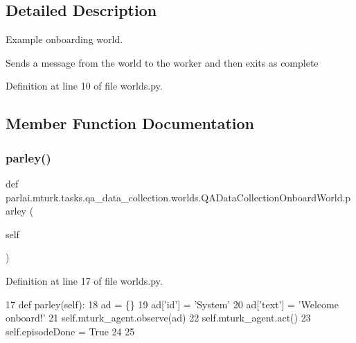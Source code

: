 \subsection{Detailed Description}
\begin{DoxyVerb}Example onboarding world.

Sends a message from the world to the worker and then exits as complete
\end{DoxyVerb}
 

Definition at line 10 of file worlds.\+py.



\subsection{Member Function Documentation}
\mbox{\label{classparlai_1_1mturk_1_1tasks_1_1qa__data__collection_1_1worlds_1_1QADataCollectionOnboardWorld_a2cbf0247b9bf28187bbfe164082ec5fb}} 
\subsubsection{\texorpdfstring{parley()}{parley()}}
{\footnotesize\ttfamily def parlai.\+mturk.\+tasks.\+qa\+\_\+data\+\_\+collection.\+worlds.\+Q\+A\+Data\+Collection\+Onboard\+World.\+parley (\begin{DoxyParamCaption}\item[{}]{self }\end{DoxyParamCaption})}



Definition at line 17 of file worlds.\+py.


\begin{DoxyCode}
17     \textcolor{keyword}{def }parley(self):
18         ad = \{\}
19         ad[\textcolor{stringliteral}{'id'}] = \textcolor{stringliteral}{'System'}
20         ad[\textcolor{stringliteral}{'text'}] = \textcolor{stringliteral}{'Welcome onboard!'}
21         self.mturk\_agent.observe(ad)
22         self.mturk\_agent.act()
23         self.episodeDone = \textcolor{keyword}{True}
24 
25 
\end{DoxyCode}


